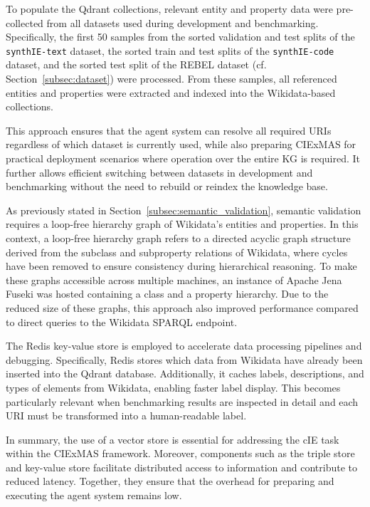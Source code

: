 \documentclass[a4paper,oneside,bibliography=totoc]{scrbook}
\begin{document}
To populate the Qdrant collections, relevant entity and property data were pre-collected from all datasets used during development and benchmarking. Specifically, the first 50 samples from the sorted validation and test splits of the \texttt{synthIE-text} dataset, the sorted train and test splits of the \texttt{synthIE-code} dataset, and the sorted test split of the REBEL dataset (cf. Section~\ref{subsec:dataset}) were processed. From these samples, all referenced entities and properties were extracted and indexed into the Wikidata-based collections.

This approach ensures that the agent system can resolve all required \acp{URI} regardless of which dataset is currently used, while also preparing CIExMAS for practical deployment scenarios where operation over the entire \ac{KG} is required. It further allows efficient switching between datasets in development and benchmarking without the need to rebuild or reindex the knowledge base.

As previously stated in Section~\ref{subsec:semantic_validation}, semantic validation requires a loop-free hierarchy graph of Wikidata’s entities and properties. In this context, a loop-free hierarchy graph refers to a directed acyclic graph structure derived from the subclass and subproperty relations of Wikidata, where cycles have been removed to ensure consistency during hierarchical reasoning. To make these graphs accessible across multiple machines, an instance of Apache Jena Fuseki was hosted containing a class and a property hierarchy. Due to the reduced size of these graphs, this approach also improved performance compared to direct queries to the Wikidata \ac{SPARQL} endpoint.

The Redis key-value store is employed to accelerate data processing pipelines and debugging. Specifically, Redis stores which data from Wikidata have already been inserted into the Qdrant database. Additionally, it caches labels, descriptions, and types of elements from Wikidata, enabling faster label display. This becomes particularly relevant when benchmarking results are inspected in detail and each \ac{URI} must be transformed into a human-readable label.

In summary, the use of a vector store is essential for addressing the \ac{cIE} task within the CIExMAS framework. Moreover, components such as the triple store and key-value store facilitate distributed access to information and contribute to reduced latency. Together, they ensure that the overhead for preparing and executing the agent system remains low.
\end{document}
